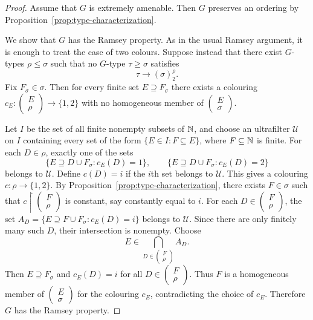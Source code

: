 \begin{proof}

    Assume that \(G\) is extremely amenable. Then \(G\) preserves an ordering by Proposition~\ref{prop:type-characterization}.

    We show that \(G\) has the Ramsey property. As in the usual Ramsey argument, it is enough to treat the case of two colours. Suppose instead that there exist \(G\)-types \(\rho\leq \sigma\) such that no \(G\)-type \(\tau\geq \sigma\) satisfies
    \[
        \tau\to (\sigma)^\rho_2.
    \]
    Fix \(F_\sigma\in \sigma\). Then for every finite set \(E\supseteq F_\sigma\) there exists a colouring \(c_E\colon \begin{pmatrix} E \\ \rho \end{pmatrix}\to\{1,2\}\) with no homogeneous member of \(\begin{pmatrix} E \\ \sigma \end{pmatrix}\).

    Let \(I\) be the set of all finite nonempty subsets of \(\mathbb{N}\), and choose an ultrafilter \(\mathcal U\) on \(I\) containing every set of the form \(\{E\in I : F\subseteq E\}\), where \(F\subseteq\mathbb{N}\) is finite. For each \(D\in \rho\), exactly one of the sets
    \[
        \{E\supseteq D\cup F_\sigma : c_E(D)=1\},
        \qquad
        \{E\supseteq D\cup F_\sigma : c_E(D)=2\}
    \]
    belongs to \(\mathcal U\).
    Define \(c(D)=i\) if the \(i\)th set belongs to \(\mathcal U\).
    This gives a colouring \(c\colon \rho\to\{1,2\}\).
    By Proposition~\ref{prop:type-characterization}, there exists \(F\in \sigma\) such that \(c\restriction \begin{pmatrix} F \\ \rho \end{pmatrix}\) is constant, say constantly equal to \(i\).
    For each \(D\in \begin{pmatrix} F \\ \rho \end{pmatrix}\), the set \(A_D=\{E\supseteq F\cup F_\sigma : c_E(D)=i\}\) belongs to \(\mathcal U\).
    Since there are only finitely many such \(D\), their intersection is nonempty.
    Choose
    \[
        E\in \bigcap_{D\in \begin{pmatrix} F \\ \rho \end{pmatrix}} A_D.
    \]
    Then \(E\supseteq F_\sigma\) and \(c_E(D)=i\) for all \(D\in \begin{pmatrix} F \\ \rho \end{pmatrix}\).
    Thus \(F\) is a homogeneous member of \(\begin{pmatrix} E \\ \sigma \end{pmatrix}\) for the colouring \(c_E\), contradicting the choice of \(c_E\).
    Therefore \(G\) has the Ramsey property.


\end{proof}
